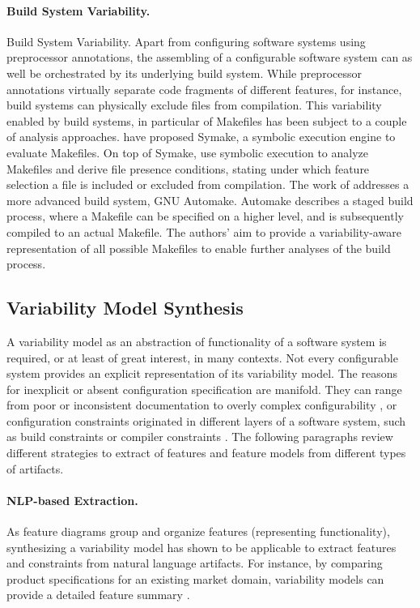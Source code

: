 \paragraph{Build System Variability.} Build System Variability. Apart from
configuring software systems using preprocessor annotations, the assembling of
a configurable software system can as well be orchestrated by its underlying
build system. While preprocessor annotations virtually separate code fragments
of different features, for instance, build systems can physically exclude files
from compilation. This variability enabled by build systems, in particular of
Makefiles has been subject to a couple of analysis approaches. \cite{tamrawi_build_2012} have
proposed Symake, a symbolic execution engine to evaluate Makefiles.
On top of Symake, \cite{zhou_extracting_2015} use symbolic execution to analyze
Makefiles and derive file presence conditions, stating under which feature
selection a file is included or excluded from compilation. The work of
\cite{al-kofahi_escaping_2016} addresses a more advanced build system, GNU Automake.
Automake describes a staged build process, where a Makefile can be specified on
a higher level, and is subsequently compiled to an actual Makefile. The
authors’ aim to provide a variability-aware representation of all possible
Makefiles to enable further analyses of the build process.

\subsection{Variability Model Synthesis} \label{sec:feature_model_synthesis} 
A variability model as an abstraction of functionality of a software system is
required, or at least of great interest, in many contexts. Not every
configurable system provides an explicit representation of its variability
model. The reasons for inexplicit or absent configuration specification are
manifold. They can range from poor or inconsistent documentation \cite{rabkin_static_2011} to
overly complex configurability \cite{xu_hey_2015}, or configuration constraints originated in different layers of a software system,
such as build constraints or compiler constraints \cite{nadi_where_2015}. The
following paragraphs review different strategies to extract of features and
feature models from different types of artifacts.

\paragraph{NLP-based Extraction.} As feature diagrams group and organize
features (representing functionality), synthesizing a variability model has shown to be applicable to extract features
and constraints from natural language artifacts. For instance, by comparing
product specifications for an existing market domain, variability models can
provide a detailed feature summary \citep{alves_exploratory_2008}.

